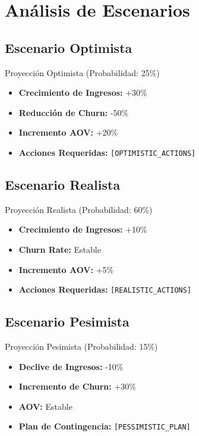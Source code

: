 \documentclass[12pt,a4paper]{article}
\begin{document}
\section{\textcolor{primaryblue}{Análisis de Escenarios}}

\subsection{Escenario Optimista}

\begin{successbox}{Proyección Optimista (Probabilidad: 25\%)}
\begin{itemize}
    \item \textbf{Crecimiento de Ingresos:} +30\%
    \item \textbf{Reducción de Churn:} -50\%
    \item \textbf{Incremento AOV:} +20\%
    \item \textbf{Acciones Requeridas:} \texttt{[OPTIMISTIC\_ACTIONS]}
\end{itemize}
\end{successbox}

\subsection{Escenario Realista}

\begin{infobox}{Proyección Realista (Probabilidad: 60\%)}
\begin{itemize}
    \item \textbf{Crecimiento de Ingresos:} +10\%
    \item \textbf{Churn Rate:} Estable
    \item \textbf{Incremento AOV:} +5\%
    \item \textbf{Acciones Requeridas:} \texttt{[REALISTIC\_ACTIONS]}
\end{itemize}
\end{infobox}

\subsection{Escenario Pesimista}

\begin{warningbox}{Proyección Pesimista (Probabilidad: 15\%)}
\begin{itemize}
    \item \textbf{Declive de Ingresos:} -10\%
    \item \textbf{Incremento de Churn:} +30\%
    \item \textbf{AOV:} Estable
    \item \textbf{Plan de Contingencia:} \texttt{[PESSIMISTIC\_PLAN]}
\end{itemize}
\end{warningbox}
\end{document}
